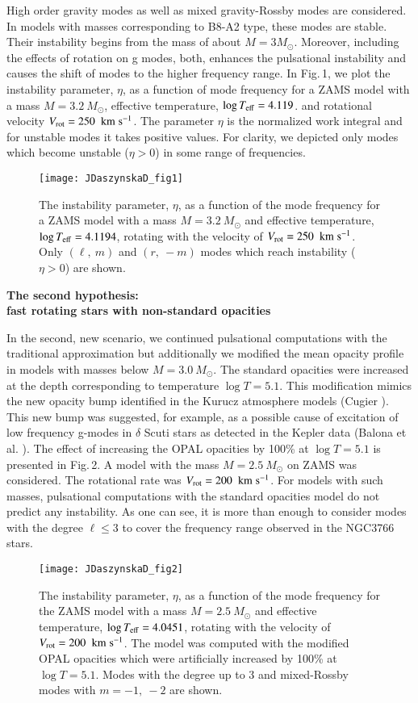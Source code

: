 \documentclass[epj,twocolumn]{webofc}
\newcommand{\kmps}{\;{\rm km\;s^{{-}1}}}
\begin{document}
High order gravity modes as well as mixed gravity-Rossby modes are considered. In models with masses corresponding to B8-A2 type, these modes are stable. Their instability begins from the mass of about $M=3 M_\odot$. Moreover, including the effects of rotation on g modes, both, enhances the pulsational instability and causes the shift of modes to the higher frequency range.
In Fig.\,1, we plot the instability parameter, $\eta$, as a function of mode frequency for a ZAMS model with a mass $M=3.2~M_\odot$, effective temperature, $\log T_{\rm eff}=4.119$.
and rotational velocity $V_{\rm rot}=250~\kmps$. The parameter $\eta$ is the normalized work integral and for unstable modes it takes positive values. For clarity, we depicted only modes which become unstable ($\eta >0$) in some range of frequencies.
%
\begin{figure*}
\centering
\texttt{[image: JDaszynskaD\_fig1]}
\caption{The instability parameter, $\eta$, as a function of the mode frequency for a ZAMS model with a mass $M=3.2~M_\odot$
and effective temperature, $\log T_{\rm eff}=4.1194$, rotating with the velocity of $V_{\rm rot}=250~\kmps$.
Only $(\ell,~m)$ and $(r,~-m)$ modes which reach instability ($\eta>0$) are shown.}
\label{fig-1}       %
\end{figure*}


{\bf The second hypothesis: \\
fast rotating stars with non-standard opacities}

In the second, new scenario, we continued pulsational computations with the traditional approximation but additionally we modified the mean opacity profile
in models with masses below $M=3.0~M_\odot$. The standard opacities were increased at the depth corresponding to temperature $\log T=5.1$.
This modification mimics the new opacity bump identified in the Kurucz atmosphere models (Cugier \citep{2014A&A...565A..76C}). This new bump was suggested, for example,
as a possible cause of excitation of low frequency g-modes in $\delta$ Scuti stars as detected in the Kepler data (Balona et al. \citep{2015MNRAS.452.3073B}).
The effect of increasing the OPAL opacities by 100\% at $\log T=5.1$ is presented in Fig.\,2. A model with the mass $M=2.5~M_\odot$ on ZAMS was considered.
The rotational rate was $V_{\rm rot}=200~\kmps$.  For models with such masses, pulsational computations with the standard opacities model do not predict any instability.
As one can see, it is more than enough to consider modes with the degree $\ell\le 3$ to cover the frequency range observed in the NGC3766 stars.
%
\begin{figure*}
\centering
\texttt{[image: JDaszynskaD\_fig2]}
\caption{The instability parameter, $\eta$, as a function of the mode frequency for the ZAMS model with a mass $M=2.5~M_\odot$
and effective temperature, $\log T_{\rm eff}=4.0451$, rotating with the velocity of $V_{\rm rot}=200~\kmps$.
The model was computed with the modified OPAL opacities which were artificially increased by 100\% at $\log T=5.1$.
Modes with the degree up to 3 and mixed-Rossby modes with $m=-1,~-2$ are shown.}
\label{fig-2}       %
\end{figure*}
\end{document}
